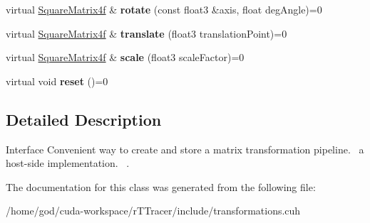 \begin{DoxyCompactItemize}
\item 
virtual \hyperlink{class_square_matrix4}{Square\+Matrix4f} \& {\bfseries rotate} (const float3 \&axis, float deg\+Angle)=0\hypertarget{class_pipeline_a2b50d058b74ce266e58acd4ab1622ef9}{}\label{class_pipeline_a2b50d058b74ce266e58acd4ab1622ef9}

\item 
virtual \hyperlink{class_square_matrix4}{Square\+Matrix4f} \& {\bfseries translate} (float3 translation\+Point)=0\hypertarget{class_pipeline_a7c12b9fa044a6341e08d5639c9ee7db4}{}\label{class_pipeline_a7c12b9fa044a6341e08d5639c9ee7db4}

\item 
virtual \hyperlink{class_square_matrix4}{Square\+Matrix4f} \& {\bfseries scale} (float3 scale\+Factor)=0\hypertarget{class_pipeline_a60ed7a51148b346075ad5aa23c766d30}{}\label{class_pipeline_a60ed7a51148b346075ad5aa23c766d30}

\item 
virtual void {\bfseries reset} ()=0\hypertarget{class_pipeline_a632192d4703d48e1e7fec206c6dcddf7}{}\label{class_pipeline_a632192d4703d48e1e7fec206c6dcddf7}

\end{DoxyCompactItemize}


\subsection{Detailed Description}
Interface  Convenient way to create and store a matrix transformation pipeline.~\newline
 a host-\/side implementation.~\newline
. 

The documentation for this class was generated from the following file\+:\begin{DoxyCompactItemize}
\item 
/home/god/cuda-\/workspace/r\+T\+Tracer/include/transformations.\+cuh\end{DoxyCompactItemize}
